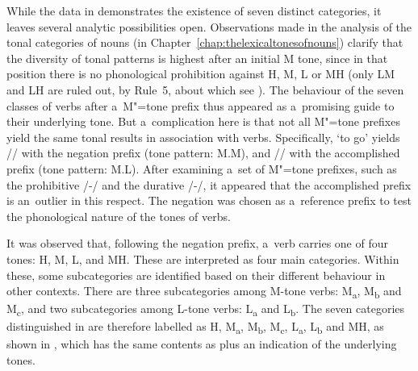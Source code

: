 While the data in  demonstrates the existence of seven distinct categories, it leaves several
analytic possibilities open. Observations made in the analysis of the tonal categories of nouns (in Chapter~\ref{chap:thelexicaltonesofnouns}) clarify that the diversity of tonal patterns is highest after an initial M tone, since in that position there is no phonological prohibition against H, M, L or MH (only LM and LH are ruled out, by Rule~5, about which see ). The behaviour of the seven classes of verbs after a~M"=tone prefix thus appeared as a~promising guide to their underlying tone. But a~complication here is that not all M"=tone prefixes yield the same tonal results in association with verbs. Specifically, ‘to go’ yields // with the {negation} prefix (tone pattern: M.M), and // with the {accomplished} prefix (tone pattern: M.L). After examining a~set of M"=tone prefixes, such as the {prohibitive} /-/ and the {durative} /-/, it appeared that the {accomplished} prefix is an~outlier in this respect. The {negation} was chosen as a~reference prefix to test the phonological nature of the tones of verbs. 

It was observed that, following the {negation} prefix, a~verb carries one of four tones: H, M, L, and MH. These are interpreted as four main categories. Within these, some subcategories are identified based on their different behaviour in other contexts. There are three subcategories among M-tone verbs: M\textsubscript{a}, M\textsubscript{b} and M\textsubscript{c}, and two subcategories among L-tone verbs: L\textsubscript{a} and L\textsubscript{b}. The seven categories distinguished in  are therefore labelled as H, M\textsubscript{a}, M\textsubscript{b}, M\textsubscript{c}, L\textsubscript{a}, L\textsubscript{b} and MH, as shown in , which has the same contents as  plus an indication of the underlying tones.

